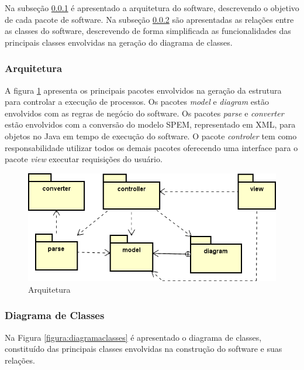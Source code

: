 Na subseção \ref{subsection:arquitetura} é apresentado a arquitetura do software, descrevendo o objetivo de cada pacote de software. Na subseção \ref{subsection:classes} são apresentadas as relações entre as classes do software, descrevendo de forma simplificada as funcionalidades das principais classes envolvidas na geração do diagrama de classes.

\subsubsection{Arquitetura}\label{subsection:arquitetura}
A figura \ref{figura:figuraArquitetura} apresenta os principais pacotes envolvidos na geração da estrutura para controlar a execução de processos. Os pacotes \textit{model} e \textit{diagram} estão envolvidos com as regras de negócio do software. Os pacotes \textit{parse} e \textit{converter} estão envolvidos com a conversão do modelo SPEM, representado em XML, para objetos no Java em tempo de execução do software.
O pacote \textit{controler} tem como responsabilidade utilizar todos os demais pacotes oferecendo uma interface para o pacote \textit{view} executar requisições do usuário. 

\begin{figure}[!htb]
	\caption{Arquitetura} \label{figura:figuraArquitetura}
	\begin{center}
		\includegraphics[scale=0.5]{img/ferramenta_arquitetura}
	\end{center}
\end{figure}
\subsubsection{Diagrama de Classes}\label{subsection:classes}
Na Figura \ref{figura:diagramaclasses} é apresentado o diagrama de classes, constituído das principais classes envolvidas na construção do software e suas relações. 

